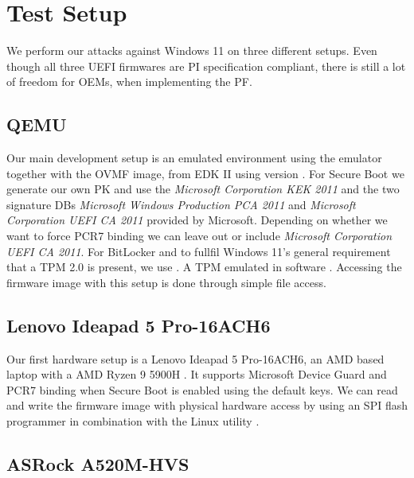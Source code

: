 
\chapter{Test Setup}
\label{sec:test-setup}

We perform our attacks against Windows 11 on three different setups.
Even though all three \ac{UEFI} firmwares are \ac{PI} specification compliant, there is still a lot of freedom for \acp{OEM}, when implementing the \ac{PF}.

\section{\acs{QEMU}}
\label{sec:test-setup:qemu}

Our main development setup is an emulated environment using the emulator  \cite{qemu} together with the \ac{OVMF} image, from \ac{EDK} II using version .
For Secure Boot we generate our own \ac{PK} and use the \emph{Microsoft Corporation \acs{KEK}  2011} and the two signature \acp{DB} \emph{Microsoft Windows Production PCA 2011} and \emph{Microsoft Corporation UEFI CA 2011} provided by Microsoft.
Depending on whether we want to force \ac{PCR}7 binding we can leave out or include \emph{Microsoft Corporation UEFI CA 2011}.
For BitLocker and to fullfil Windows 11's general requirement that a \ac{TPM} 2.0 is present, we use .
A \ac{TPM} emulated in software \cite{swtpm}.
Accessing the firmware image with this setup is done through simple file access.

\section{Lenovo Ideapad 5 Pro-16ACH6}
\label{sec:test-setup:lenovo}

Our first hardware setup is a Lenovo Ideapad 5 Pro-16ACH6, an \ac{AMD} based laptop with a \ac{AMD} Ryzen 9 5900H \cite{lenovo-ideapad}.
It supports Microsoft Device Guard and \ac{PCR}7 binding when Secure Boot is enabled using the default keys.
We can read and write the firmware image with physical hardware access by using an \ac{SPI} flash programmer in combination with the Linux utility .

\section{ASRock A520M-HVS}
\label{sec:test-setup:asrock}

